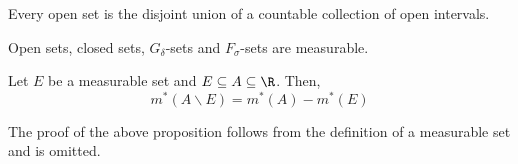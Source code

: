 \begin{lemma}
    Every open set is the disjoint union of a countable collection of open intervals.
\end{lemma}

\begin{corollary}
    Open sets, closed sets, $G_\delta$-sets and $F_\sigma$-sets are measurable.
\end{corollary}

\begin{proposition}
    Let $E$ be a measurable set and $E\subseteq A\subseteq\R$. Then, 
    \begin{equation*}
        m^*(A\backslash E) = m^*(A) - m^*(E)
    \end{equation*}
\end{proposition}
The proof of the above proposition follows from the definition of a measurable set and is omitted.

